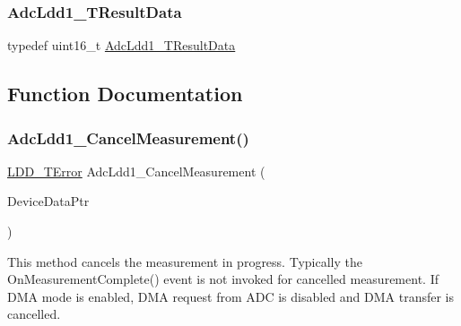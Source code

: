 \subsubsection{\texorpdfstring{Adc\+Ldd1\+\_\+\+T\+Result\+Data}{AdcLdd1\_TResultData}}
{\footnotesize\ttfamily typedef uint16\+\_\+t \hyperlink{group___adc_ldd1__module_ga8eae0d930b3aef7c47506b32a22e4f12}{Adc\+Ldd1\+\_\+\+T\+Result\+Data}}



\subsection{Function Documentation}
\mbox{\label{group___adc_ldd1__module_ga26924e7e4ca2c272140fbaf6ecf9c18d}} 
\subsubsection{\texorpdfstring{Adc\+Ldd1\+\_\+\+Cancel\+Measurement()}{AdcLdd1\_CancelMeasurement()}}
{\footnotesize\ttfamily \hyperlink{group___p_e___types__module_ga24c2b045fd04e79e85f261ce4df35588}{L\+D\+D\+\_\+\+T\+Error} Adc\+Ldd1\+\_\+\+Cancel\+Measurement (\begin{DoxyParamCaption}\item[{\hyperlink{group___p_e___types__module_gac5cf1362f1f0e3a2ce71b1bf2276d091}{L\+D\+D\+\_\+\+T\+Device\+Data} $\ast$}]{Device\+Data\+Ptr }\end{DoxyParamCaption})}



This method cancels the measurement in progress. Typically the On\+Measurement\+Complete() event is not invoked for cancelled measurement. If D\+MA mode is enabled, D\+MA request from A\+DC is disabled and D\+MA transfer is cancelled. 


